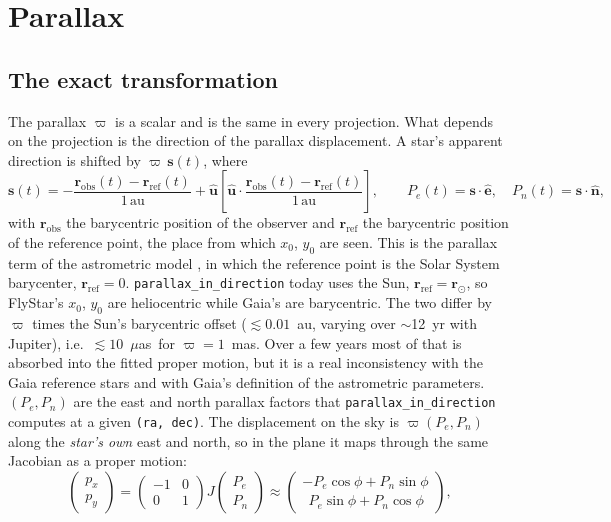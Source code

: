 \documentclass[11pt]{article}
\newcommand{\code}[1]{\texttt{#1}}
\newcommand{\muas}{$\mu$as}
\newcommand{\uvec}[1]{\hat{\mathbf #1}}
\begin{document}
\section{Parallax}
\label{sec:parallax}

\subsection{The exact transformation}

The parallax $\varpi$ is a scalar and is the same in every projection. What
depends on the projection is the direction of the parallax displacement. A
star's apparent direction is shifted by $\varpi\,\mathbf s(t)$, where
\begin{equation}
  \mathbf s(t) = -\frac{\mathbf r_\mathrm{obs}(t) - \mathbf r_\mathrm{ref}(t)}{1\,\mathrm{au}}
  + \uvec u\left[\uvec u\cdot\frac{\mathbf r_\mathrm{obs}(t) - \mathbf r_\mathrm{ref}(t)}{1\,\mathrm{au}}\right],
  \qquad
  P_e(t) = \mathbf s\cdot\uvec e, \quad P_n(t) = \mathbf s\cdot\uvec n,
  \label{eq:pfac}
\end{equation}
with $\mathbf r_\mathrm{obs}$ the barycentric position of the observer and
$\mathbf r_\mathrm{ref}$ the barycentric position of the reference point, the
place from which $x_0$, $y_0$ are seen. This is the parallax term of the
astrometric model \citep{ESA1997, Lindegren2012}, in which the reference point
is the Solar System barycenter, $\mathbf r_\mathrm{ref} = 0$.
\code{parallax\_in\_direction} today uses the Sun,
$\mathbf r_\mathrm{ref} = \mathbf r_\odot$, so FlyStar's $x_0$, $y_0$ are
heliocentric while Gaia's are barycentric. The two differ by $\varpi$ times
the Sun's barycentric offset ($\lesssim 0.01$~au, varying over $\sim$12~yr
with Jupiter), i.e.\ $\lesssim 10$~\muas\ for $\varpi = 1$~mas. Over a few
years most of that is absorbed into the fitted proper motion, but it is a real
inconsistency with the Gaia reference stars and with Gaia's definition of the
astrometric parameters. $(P_e, P_n)$ are the east and north parallax factors
that \code{parallax\_in\_direction} computes at a given \code{(ra, dec)}. The
displacement on the sky is $\varpi(P_e,P_n)$ along the \emph{star's own} east
and north, so in the plane it maps through the same Jacobian as a proper motion:
\begin{equation}
  \begin{pmatrix} p_x \\ p_y \end{pmatrix}
  = \begin{pmatrix} -1 & 0 \\ 0 & 1 \end{pmatrix} J
    \begin{pmatrix} P_e \\ P_n \end{pmatrix}
  \approx
  \begin{pmatrix} -P_e\cos\phi + P_n\sin\phi \\ \ \ P_e\sin\phi + P_n\cos\phi\end{pmatrix},
  \label{eq:pin}
\end{equation}
\end{document}
